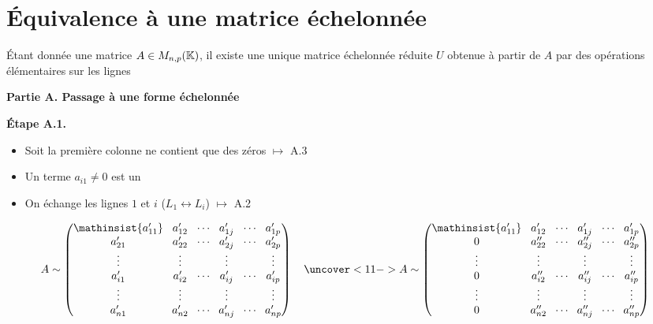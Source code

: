 \section{\'Equivalence à une matrice échelonnée}

\begin{frame}
\begin{theoreme}
\'Etant donnée une matrice $A \in M_{n,p}(\mathbb{K})$, il existe une unique  
matrice échelonnée réduite $U$ obtenue à partir de $A$ 
par des opérations élémentaires sur les lignes 
\end{theoreme}
\end{frame}



\begin{frame}

\textbf{Partie A. Passage à une forme échelonnée}

\pause
\textbf{\'Etape A.1.}  

\pause
\begin{itemize}
  \item Soit la première colonne ne contient que des zéros $\mapsto$ A.3
  \pause
  \item Un terme $a_{i1} \neq 0$ est un 
%   
  \pause
  \item On échange les lignes $1$ 
et $i$ ($L_1 \leftrightarrow L_i$) $\mapsto$ A.2
\end{itemize}

\pause
\vspace*{-2ex}
{\small$$
\arraycolsep=1.4mm
A\sim \begin{pmatrix}
\mathinsist{a'_{11}}&a'_{12}&\cdots&a'_{1j}&\cdots&a'_{1p}\\
a'_{21}&a'_{22}&\cdots&a'_{2j}&\cdots&a'_{2p}\\
\vdots&\vdots&&\vdots&&\vdots\\
a'_{i1}&a'_{i2}&\cdots&a'_{ij}&\cdots&a'_{ip}\\
\vdots&\vdots&&\vdots&&\vdots\\
a'_{n1}&a'_{n2}&\cdots&a'_{nj}&\cdots&a'_{np}\\
\end{pmatrix}
\quad
\uncover<11->{
A\sim\begin{pmatrix}
\mathinsist{a'_{11}}&a'_{12}&\cdots&a'_{1j}&\cdots&a'_{1p}\\
0&a''_{22}&\cdots&a''_{2j}&\cdots&a''_{2p}\\
\vdots&\vdots&&\vdots&&\vdots\\
0&a''_{i2}&\cdots&a''_{ij}&\cdots&a''_{ip}\\
\vdots&\vdots&&\vdots&&\vdots\\
0&a''_{n2}&\cdots&a''_{nj}&\cdots&a''_{np}\\
\end{pmatrix}}
$$}


\end{frame}
